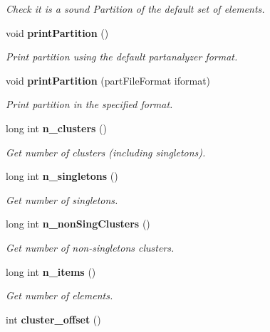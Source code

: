\begin{CompactItemize}
\begin{CompactList}\small\item\em Check it is a sound Partition of the default set of elements. \item\end{CompactList}\item 
void {\bf print\-Partition} ()\label{classPartition_a6}

\begin{CompactList}\small\item\em Print partition using the default partanalyzer format. \item\end{CompactList}\item 
void {\bf print\-Partition} (part\-File\-Format iformat)\label{classPartition_a7}

\begin{CompactList}\small\item\em Print partition in the specified format. \item\end{CompactList}\item 
long int {\bf n\_\-clusters} ()\label{classPartition_a8}

\begin{CompactList}\small\item\em Get number of clusters (including singletons). \item\end{CompactList}\item 
long int {\bf n\_\-singletons} ()\label{classPartition_a9}

\begin{CompactList}\small\item\em Get number of singletons. \item\end{CompactList}\item 
long int {\bf n\_\-non\-Sing\-Clusters} ()\label{classPartition_a10}

\begin{CompactList}\small\item\em Get number of non-singletons clusters. \item\end{CompactList}\item 
long int {\bf n\_\-items} ()\label{classPartition_a11}

\begin{CompactList}\small\item\em Get number of elements. \item\end{CompactList}\item 
int {\bf cluster\_\-offset} ()\label{classPartition_a12}


\end{CompactItemize}
